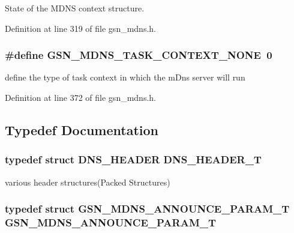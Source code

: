 State of the MDNS context structure. 



Definition at line 319 of file gsn\_\-mdns.h.

\hypertarget{a00668_ga56106404858e7c3f99fa52890f684d53}{
\subsubsection[{GSN\_\-MDNS\_\-TASK\_\-CONTEXT\_\-NONE}]{\setlength{\rightskip}{0pt plus 5cm}\#define GSN\_\-MDNS\_\-TASK\_\-CONTEXT\_\-NONE~0}}
\label{a00668_ga56106404858e7c3f99fa52890f684d53}


define the type of task context in which the mDns server will run 



Definition at line 372 of file gsn\_\-mdns.h.



\subsection{Typedef Documentation}
\hypertarget{a00668_gaf26129a48ef3757ef5060ba8bb457d9c}{
\subsubsection[{DNS\_\-HEADER\_\-T}]{\setlength{\rightskip}{0pt plus 5cm}typedef struct {\bf DNS\_\-HEADER} {\bf DNS\_\-HEADER\_\-T}}}
\label{a00668_gaf26129a48ef3757ef5060ba8bb457d9c}


various header structures(Packed Structures) 

\hypertarget{a00668_ga41a672d3bce37ca4fe0d8b08524334a6}{
\subsubsection[{GSN\_\-MDNS\_\-ANNOUNCE\_\-PARAM\_\-T}]{\setlength{\rightskip}{0pt plus 5cm}typedef struct {\bf GSN\_\-MDNS\_\-ANNOUNCE\_\-PARAM\_\-T} {\bf GSN\_\-MDNS\_\-ANNOUNCE\_\-PARAM\_\-T}}}
\label{a00668_ga41a672d3bce37ca4fe0d8b08524334a6}



